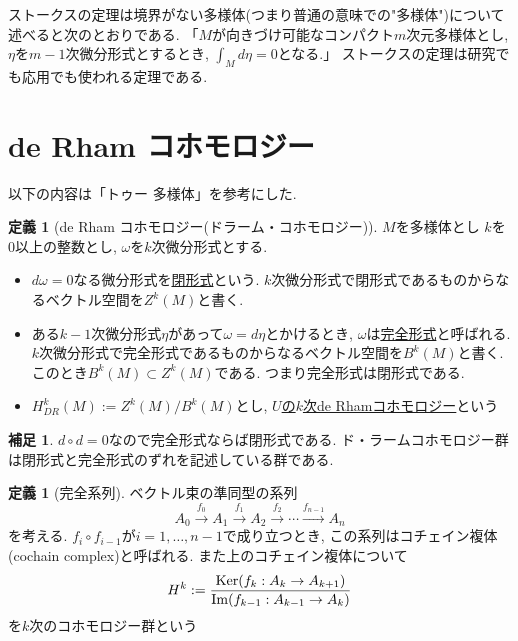 \documentclass[dvipdfmx,a4paper,11pt]{article}
\newcommand{\Ker}{{\rm Ker}}
\theoremstyle{definition}
\newtheorem{dfn}[thm]{定義}
\newtheorem{rem}[thm]{補足}
\begin{document}
ストークスの定理は境界がない多様体(つまり普通の意味での"多様体")について述べると次のとおりである.
「$M$が向きづけ可能なコンパクト$m$次元多様体とし, $\eta$を$m-1$次微分形式とするとき, $\int_{M} d \eta =0 $となる.」
ストークスの定理は研究でも応用でも使われる定理である. 

\section{de Rham コホモロジー}

 以下の内容は「トゥー 多様体」を参考にした.
 

    
\begin{tcolorbox}[
    colback = white,
    colframe = green!35!black,
    fonttitle = \bfseries,
    breakable = true]
\begin{dfn}[de Rham コホモロジー(ドラーム・コホモロジー)]
$M$を多様体とし $k$を0以上の整数とし, $\omega$を$k$次微分形式とする. 
\begin{itemize}
 \setlength{\parskip}{0cm}
  \setlength{\itemsep}{2pt}
\item  $d\omega=0$なる微分形式を\underline{閉形式}という. $k$次微分形式で閉形式であるものからなるベクトル空間を$Z^k(M)$と書く. 
\item ある$k-1$次微分形式$\eta$があって$\omega = d \eta$とかけるとき, $\omega$は\underline{完全形式}と呼ばれる. $k$次微分形式で完全形式であるものからなるベクトル空間を$B^k(M)$と書く. このとき$B^k(M) \subset Z^k (M)$である. つまり完全形式は閉形式である. 
\item $H^{k}_{DR}(M) := Z^k (M)/B^k(M)$とし, \underline{$U$の$k$次de Rhamコホモロジー}という
 \end{itemize}
\end{dfn}
\end{tcolorbox}  


\begin{rem}
$d \circ d =0$なので完全形式ならば閉形式である.  ド・ラームコホモロジー群は閉形式と完全形式のずれを記述している群である.
\end{rem}


\begin{tcolorbox}[
    colback = white,
    colframe = green!35!black,
    fonttitle = \bfseries,
    breakable = true]
\begin{dfn}[完全系列]
ベクトル束の準同型の系列
$$
A_0 \stackrel{f_0}{\to} A_1 \stackrel{f_1}{\to} A_2 \stackrel{f_2}{\to}  \cdots \stackrel{f_{n-1}}{\to} A_{n}
$$
を考える. $f_{i} \circ f_{i-1}$が$i=1, \ldots, n-1$で成り立つとき, この系列はコチェイン複体(cochain complex)と呼ばれる. また上のコチェイン複体について
$$
H^{k}:= \frac{\Ker (f_k : A_k\rightarrow  A_{k+1})}{\Im(f_{k-1} :  A_{k-1}\rightarrow  A_{k}) }
$$
を$k$次のコホモロジー群という
\end{dfn}
\end{tcolorbox} 
\end{document}
